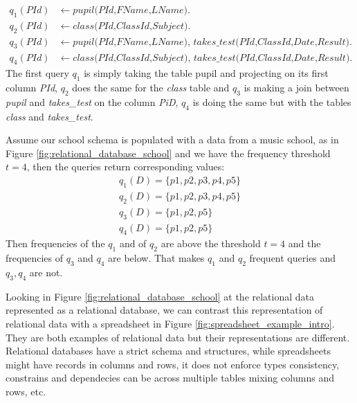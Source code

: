 \begin{equation*}
\begin{aligned}
q_1(\textit{PId})&\leftarrow \textit{pupil(PId,FName,LName)}.\\
q_2(\textit{PId})&\leftarrow \textit{class(PId,ClassId,Subject)}. \\
q_3(\textit{PId})&\leftarrow \textit{pupil(PId,FName,LName), takes\_test(PId,ClassId,Date,Result)}.\\
q_4(\textit{PId})&\leftarrow \textit{class(PId,ClassId,Subject), takes\_test(PId,ClassId,Date,Result)}.
\end{aligned}
\end{equation*}
The first query $q_1$ is simply taking the table pupil and projecting
on its first column \textit{PId}, $q_2$ does the same for the
\textit{class} table and $q_3$ is making a join between \textit{pupil}
and \textit{takes\_test} on the column \textit{PiD}, $q_4$ is doing the same
but with the tables \textit{class} and \textit{takes\_test}.

Assume our school schema is populated with a data from a music school,
as in Figure \ref{fig:relational_database_school} and we have the
frequency threshold $t=4$, then the queries return corresponding
values:
\begin{equation*}
\begin{aligned}
    q_1(D) = \{ p1, p2, p3, p4, p5 \} \\
    q_2(D) = \{ p1, p2, p3, p4, p5 \} \\
    q_3(D) = \{ p1, p2, p5 \} \\
    q_4(D) = \{ p1, p2, p5 \} 
\end{aligned}
\end{equation*}
Then frequencies of the $q_1$ and of $q_2$ are above the threshold $t=4$
and the frequencies of $q_3$ and $q_4$ are below. That makes $q_1$ and
$q_2$ frequent queries and $q_3,q_4$ are not.

Looking in Figure
\ref{fig:relational_database_school} at the relational data represented
as a relational database, we can contrast this representation of
relational data with a spreadsheet in Figure
\ref{fig:spreadsheet_example_intro}. They are both examples of
relational data but their representations are different. 
Relational databases have a strict schema and structures, while
spreadsheets might have records in columns and rows, it does not
enforce types consistency, constrains and dependecies can be across
multiple tables mixing columns and rows, etc.

